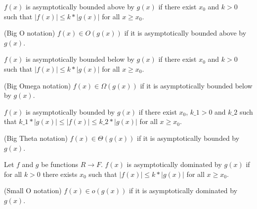 \begin{definition}
    \label{def:asymp_bounded_above}
    \leanok
    $f(x)$ is asymptotically bounded above by $g(x)$ if there exist $x_0$ and $k > 0$ 
    such that $|f(x)| \le k*|g(x)|$ for all $x \ge x_0$.
\end{definition}

\begin{definition}(Big O notation)
    \label{def:big_o}
    \leanok
    $f(x) \in O(g(x))$ if it is asymptotically bounded above by $g(x)$.
\end{definition}

\begin{definition}
    \label{def:asymp_bounded_below}
    \leanok
    $f(x)$ is asymptotically bounded below by $g(x)$ if there exist $x_0$ and $k > 0$ 
    such that $|f(x)| \le k*|g(x)|$ for all $x \ge x_0$.
\end{definition}

\begin{definition}(Big Omega notation)
    \label{def:big_omega}
    \leanok
    $f(x) \in \Omega(g(x))$ if it is asymptotically bounded below by $g(x)$.
\end{definition}

\begin{definition}
    \label{def:asymp_bounded}
    \leanok
    $f(x)$ is asymptotically bounded by $g(x)$ if there exist $x_0$, $k\_1 > 0$ 
    and $k\_2$ such that $k\_1*|g(x)| \le |f(x)| \le k\_2*|g(x)|$ for all $x \ge x_0$.
\end{definition}

\begin{definition}(Big Theta notation)
    \label{def:big_theta}
    \leanok
    $f(x) \in \Theta(g(x))$ if it is asymptotically bounded by $g(x)$. 
\end{definition}

\begin{definition}
    \label{def:asymp_dominated}
    \leanok
    Let $f$ and $g$ be functions $R \to F$. $f(x)$ is asymptotically dominated by $g(x)$ if 
    for all $k > 0$ there exists $x_0$ such that $|f(x)| \le k*|g(x)|$ for all $x \ge x_0$.
\end{definition}

\begin{definition}(Small O notation)
    \label{def:small_o}
    \leanok
    $f(x) \in o(g(x))$ if it is asymptotically dominated by $g(x)$.
\end{definition}

